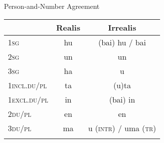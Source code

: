\documentclass[output=paper,
modfonts
]{LSP/langsci}
\begin{document}
\begin{exe}
\begin{xlist}
\ea \label{ex:chung:3} Person-and-Number Agreement\\
	\begin{tabular}{lcc}
	\lsptoprule
	& Realis & Irrealis \\
	\midrule
	1\textsc{sg}& hu & (bai) hu / bai \\
	
	2\textsc{sg}& un & un\\
	
	3\textsc{sg}& ha & u\\
	
	1\textsc{incl.du/pl} & ta & (u)ta\\
	
	1\textsc{excl.du/pl} & in & (bai) in\\
	
	2\textsc{du/pl} & en & en\\
	
	3\textsc{du/pl} & ma & u (\textsc{intr}) / uma (\textsc{tr}) \\
	\lspbottomrule
	\end{tabular}
\label{tab:persnumagr}
\z

%
%
%
%
%
%
%
%
%
%
%
%


\end{xlist}
\end{exe}
\end{document}

